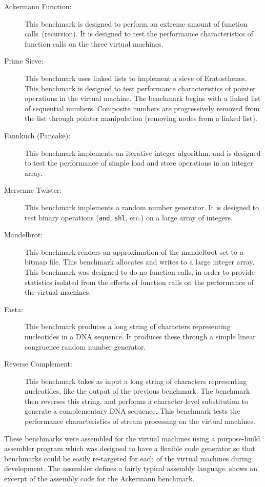 	\begin{description}
		\item[Ackermann Function:] This benchmark is designed to perform an extreme amount of function calls~(recursion). It is designed to test the performance characteristics of function calls on the three virtual machines.
		\item[Prime Sieve:] This benchmark uses linked lists to implement a sieve of Eratosthenes. This benchmark is designed to test performance characteristics of pointer operations in the virtual machine. The benchmark begins with a linked list of sequential numbers. Composite numbers are progressively removed from the list through pointer manipulation (removing nodes from a linked list).
		\item[Fannkuch (Pancake):] This benchmark implements an iterative integer algorithm, and is designed to test the performance of simple load and store operations in an integer array.
		\item[Mersenne Twister:] This benchmark implements a random number generator. It is designed to test binary operations (\texttt{and}, \texttt{shl}, etc.) on a large array of integers.
		\item[Mandelbrot:] This benchmark renders an approximation of the mandelbrot set to a bitmap file. This benchmark allocates and writes to a large integer array. This benchmark was designed to do no function calls, in order to provide statistics isolated from the effects of function calls on the performance of the virtual machines.
		\item[Fasta:] This benchmark produces a long string of characters representing nucleotides in a DNA sequence. It produces these through a simple linear congruence random number generator. 
		\item[Reverse Complement:] This benchmark takes as input a long string of characters representing nucleotides, like the output of the previous benchmark. The benchmark then reverses this string, and performs a character-level substitution to generate a complementary DNA sequence. This benchmark tests the performance characteristics of stream processing on the virtual machines.
	\end{description}
	
	These benchmarks were assembled for the virtual machines using a purpose-build assembler program which was designed to have a flexible code generator so that benchmarks could be easily re-targeted for each of the virtual machines during development. The assembler defines a fairly typical assembly language.  shows an excerpt of the assembly code for the Ackermann benchmark.
	
